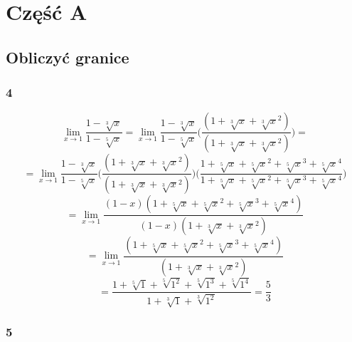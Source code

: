 \documentclass{article}
\begin{document}
\section{Część A}

\subsection{Obliczyć granice}

\subsubsection*{4}

\begin{equation*}
    \lim_{x \to 1} \frac{1 - \sqrt[3]{x}}{1 - \sqrt[5]{x}} = \lim_{x \to 1} \frac{1 - \sqrt[3]{x}}{1 - \sqrt[5]{x}}\Bigg(\frac{(1 + \sqrt[3]{x} + \sqrt[3]{x}^2)}{(1 + \sqrt[3]{x} + \sqrt[3]{x}^2)}\Bigg) =
\end{equation*}
\begin{equation*}
    = \lim_{x \to 1} \frac{1 - \sqrt[3]{x}}{1 - \sqrt[5]{x}} \Bigg(\frac{(1 + \sqrt[3]{x} + \sqrt[3]{x}^2)}{(1 + \sqrt[3]{x} + \sqrt[3]{x}^2)}\Bigg) \Bigg(\frac{1 + \sqrt[5]{x} + \sqrt[5]{x}^2 + \sqrt[5]{x}^3 + \sqrt[5]{x}^4}{1 + \sqrt[5]{x} + \sqrt[5]{x}^2 + \sqrt[5]{x}^3 + \sqrt[5]{x}^4}\Bigg)
\end{equation*}
\begin{equation*}
    = \lim_{x \to 1} \frac{(1 - x)(1 + \sqrt[5]{x} + \sqrt[5]{x}^2 + \sqrt[5]{x}^3 + \sqrt[5]{x}^4)}{(1 - x)(1 + \sqrt[3]{x} + \sqrt[3]{x}^2)}
\end{equation*}
\begin{equation*}
    = \lim_{x \to 1} \frac{(1 + \sqrt[5]{x} + \sqrt[5]{x}^2 + \sqrt[5]{x}^3 + \sqrt[5]{x}^4)}{(1 + \sqrt[3]{x} + \sqrt[3]{x}^2)}
\end{equation*}
\begin{equation*}
    = \frac{1 + \sqrt[5]{1} + \sqrt[5]{1^2} + \sqrt[5]{1^3} + \sqrt[5]{1^4}}{1 + \sqrt[3]{1} + \sqrt[3]{1^2}} = \frac{5}{3}
\end{equation*}

\subsubsection*{5}
\end{document}
